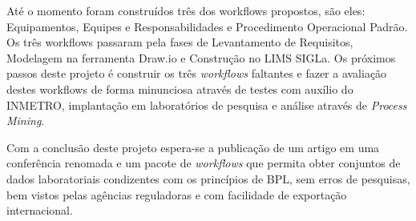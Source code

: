 Até o momento foram construídos três dos workflows propostos, são eles: Equipamentos, Equipes e Responsabilidades e Procedimento Operacional Padrão. Os três workflows passaram pela fases de Levantamento de Requisitos, Modelagem na ferramenta Draw.io e Construção no LIMS SIGLa. Os próximos passos deste projeto é construir os três \textit{workflows} faltantes e fazer a avaliação destes workflows de forma minunciosa através de testes com auxílio do INMETRO, implantação em laboratórios de pesquisa e análise através de \textit{Process Mining}. 

Com a conclusão deste projeto espera-se a publicação de um artigo em uma conferência renomada e um pacote de \textit{workflows} que permita obter conjuntos de dados laboratoriais condizentes com os princípios de BPL, sem erros de pesquisas, bem vistos pelas agências reguladoras e com facilidade de exportação internacional.
